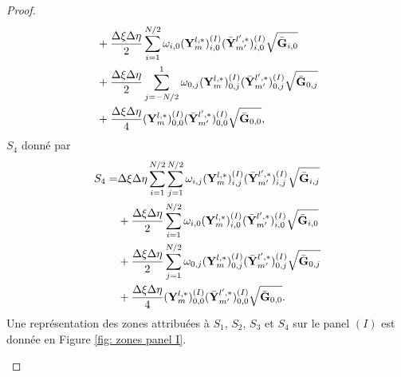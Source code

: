 \begin{proof}
\begin{align*}
	& + \dfrac{\Delta \xi \Delta \eta}{2} \displaystyle\sum\limits_{i=1}^{N/2} \omega_{i,0} (\mathbf{Y}_m^{l,*})_{i,0}^{(I)} (\bar{\mathbf{Y}}_{m'}^{l',*})_{i,0}^{(I)} \sqrt{\bar{\mathbf{G}}_{i,0}}\\
		& + \dfrac{\Delta \xi \Delta \eta}{2} \displaystyle\sum\limits_{j=-N/2}^{1} \omega_{0,j} (\mathbf{Y}_m^{l,*})_{0,j}^{(I)} (\bar{\mathbf{Y}}_{m'}^{l',*})_{0,j}^{(I)} \sqrt{\bar{\mathbf{G}}_{0,j}}\\
		& + \dfrac{\Delta \xi \Delta \eta}{4} (\mathbf{Y}_m^{l,*})_{0,0}^{(I)} (\bar{\mathbf{Y}}_{m'}^{l',*})_{0,0}^{(I)} \sqrt{\bar{\mathbf{G}}_{0,0}},
\end{align*}
$S_4$ donné par
\begin{align*}
S_4 = & \Delta \xi \Delta \eta \displaystyle\sum\limits_{i=1}^{N/2} \displaystyle\sum\limits_{j=1}^{N/2} \omega_{i,j} (\mathbf{Y}_m^{l,*})_{i,j}^{(I)} (\bar{\mathbf{Y}}_{m'}^{l',*})_{i,j}^{(I)} \sqrt{\bar{\mathbf{G}}_{i,j}} \\
	& + \dfrac{\Delta \xi \Delta \eta}{2} \displaystyle\sum\limits_{i=1}^{N/2} \omega_{i,0} (\mathbf{Y}_m^{l,*})_{i,0}^{(I)} (\bar{\mathbf{Y}}_{m'}^{l',*})_{i,0}^{(I)} \sqrt{\bar{\mathbf{G}}_{i,0}}\\
		& + \dfrac{\Delta \xi \Delta \eta}{2} \displaystyle\sum\limits_{j=1}^{N/2} \omega_{0,j} (\mathbf{Y}_m^{l,*})_{0,j}^{(I)} (\bar{\mathbf{Y}}_{m'}^{l',*})_{0,j}^{(I)} \sqrt{\bar{\mathbf{G}}_{0,j}}\\
		& + \dfrac{\Delta \xi \Delta \eta}{4} (\mathbf{Y}_m^{l,*})_{0,0}^{(I)} (\bar{\mathbf{Y}}_{m'}^{l',*})_{0,0}^{(I)} \sqrt{\bar{\mathbf{G}}_{0,0}}.
\end{align*}
Une représentation des zones attribuées à $S_1$, $S_2$, $S_3$ et $S_4$ sur le panel $(I)$ est donnée en Figure \ref{fig: zones panel I}.

\begin{figure}
\begin{center}
\end{center}
\end{figure}
\end{proof}

